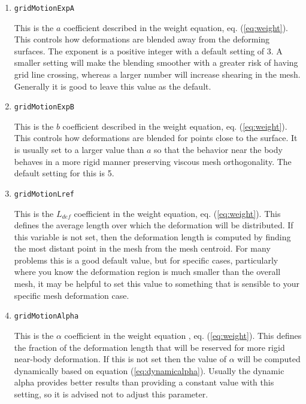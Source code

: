 \begin{enumerate}
  \item {\tt gridMotionExpA}
    
    This is the $a$ coefficient described in the weight equation, eq. (\ref{eq:weight}).  This controls how deformations are blended away from the deforming surfaces.  The exponent is a positive integer with a default setting of 3.  A smaller setting will make the blending smoother with a greater risk of having grid line crossing, whereas a larger number will increase shearing in the mesh.  Generally it is good to leave this value as the default.
    
  \item {\tt gridMotionExpB}

    This is the $b$ coefficient described in the weight equation, eq.
    (\ref{eq:weight}).  This controls how deformations are blended for
    points close to the surface.  It is usually set to a larger value
    than $a$ so that the behavior near the body behaves in a more
    rigid manner preserving viscous mesh orthogonality.  The default
    setting for this is 5.

  \item {\tt gridMotionLref}
    
    This is the $L_{def}$ coefficient in the weight equation, eq.
    (\ref{eq:weight}).  This defines the average length over which the
    deformation will be distributed.  If this variable is not set,
    then the deformation length is computed by finding the most
    distant point in the mesh from the mesh centroid.  For many
    problems this is a good default value, but for specific cases,
    particularly where you know the deformation region is much smaller
    than the overall mesh, it may be helpful to set this value to
    something that is sensible to your specific mesh deformation case.

  \item {\tt gridMotionAlpha } 

    This is the $\alpha$ coefficient in the weight equation , eq.
    (\ref{eq:weight}).  This defines the fraction of the deformation
    length that will be reserved for more rigid near-body deformation.
    If this is not set then the value of $\alpha$ will be computed
    dynamically based on equation (\ref{eq:dynamicalpha}).  Usually
    the dynamic alpha provides better results than providing a
    constant value with this setting, so it is advised not to adjust
    this parameter.



\end{enumerate}
